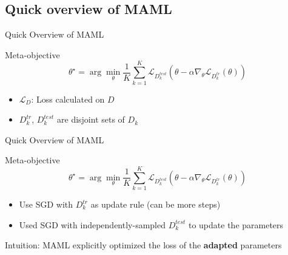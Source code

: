 \documentclass{beamer}
\begin{document}
\subsection{Quick overview of MAML}

\begin{frame}[t]{Quick Overview of MAML}
  \label{overview of maml}
  \begin{block}{Meta-objective}
    \begin{equation*}
    \theta^\star = \arg \min_\theta \frac{1}{K}\sum_{k=1}^{K}\mathcal{L}_{D_k^{test}}(\theta - \alpha \nabla_\theta \mathcal{L}_{D_k^{tr}}(\theta))
    \end{equation*}
  \end{block}

  \begin{itemize}
    \item $\mathcal{L}_D$: Loss calculated on $D$
    \item $D_k^{tr}$, $D_k^{test}$ are disjoint sets of $D_k$
  \end{itemize}
\end{frame}

\begin{frame}[t]{Quick Overview of MAML}
  \begin{block}{Meta-objective}
    \begin{equation*}
    \theta^\star = \arg \min_\theta \frac{1}{K}\sum_{k=1}^{K}\mathcal{L}_{D_k^{test}}(\theta - \alpha \nabla_\theta \mathcal{L}_{D_k^{tr}}(\theta))
    \end{equation*}
  \end{block}

  \begin{itemize}
    \item Use SGD with $D_k^{tr}$ as update rule (can be more steps)
    \item Used SGD with independently-sampled $D_k^{test}$ to update the parameters
  \end{itemize}

  \vspace{1em}

  Intuition: MAML explicitly optimized the loss of the \textbf{adapted} parameters
\end{frame}
\end{document}
